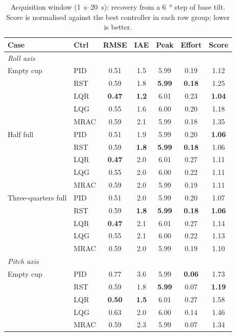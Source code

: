 \begin{table}[!ht]
\centering
\caption{Acquisition window (\SIrange{1}{20}{\second}): recovery from a \SI{6}{\degree} step of base tilt. Score is normalised against the best controller in each row group; lower is better.}
\label{tab:acq}
\footnotesize
\setlength{\tabcolsep}{3pt}
\begin{tabular}{llccccc}
\toprule
Case & Ctrl & RMSE & IAE & Peak & Effort & Score \\
\midrule
\multicolumn{7}{l}{\textit{Roll axis}} \\
Empty cup & PID & 0.51 & 1.5 & 5.99 & 0.19 & 1.12 \\
 & RST & 0.59 & 1.8 & \textbf{5.99} & \textbf{0.18} & 1.25 \\
 & LQR & \textbf{0.47} & \textbf{1.2} & 6.01 & 0.23 & \textbf{1.04} \\
 & LQG & 0.55 & 1.6 & 6.00 & 0.20 & 1.18 \\
 & MRAC & 0.59 & 2.1 & 5.99 & 0.18 & 1.35 \\
\addlinespace[2pt]
Half full & PID & 0.51 & 1.9 & 5.99 & 0.20 & \textbf{1.06} \\
 & RST & 0.59 & \textbf{1.8} & \textbf{5.99} & \textbf{0.18} & 1.06 \\
 & LQR & \textbf{0.47} & 2.0 & 6.01 & 0.27 & 1.11 \\
 & LQG & 0.55 & 2.0 & 6.00 & 0.22 & 1.11 \\
 & MRAC & 0.59 & 2.0 & 5.99 & 0.19 & 1.11 \\
\addlinespace[2pt]
Three-quarters full & PID & 0.51 & 2.0 & 5.99 & 0.20 & 1.07 \\
 & RST & 0.59 & \textbf{1.8} & \textbf{5.99} & \textbf{0.18} & \textbf{1.06} \\
 & LQR & \textbf{0.47} & 2.1 & 6.01 & 0.27 & 1.14 \\
 & LQG & 0.55 & 2.1 & 6.00 & 0.22 & 1.13 \\
 & MRAC & 0.59 & 2.0 & 5.99 & 0.19 & 1.10 \\
\midrule
\multicolumn{7}{l}{\textit{Pitch axis}} \\
Empty cup & PID & 0.77 & 3.6 & 5.99 & \textbf{0.06} & 1.73 \\
 & RST & 0.59 & 1.8 & \textbf{5.99} & 0.07 & \textbf{1.19} \\
 & LQR & \textbf{0.50} & \textbf{1.5} & 6.01 & 0.27 & 1.58 \\
 & LQG & 0.63 & 2.0 & 6.00 & 0.14 & 1.46 \\
 & MRAC & 0.59 & 2.3 & 5.99 & 0.07 & 1.34 \\

\end{tabular}
\end{table}
